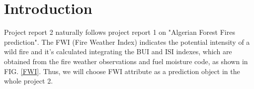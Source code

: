 \documentclass[10pt]{article}
\numberwithin{equation}{section}
\numberwithin{figure}{section}
\numberwithin{table}{section}
\begin{document}

\section{Introduction}
Project report 2 naturally follows project report 1 on "Algerian Forest Fires prediction". The FWI (Fire Weather Index) indicates the potential intensity of a wild fire and it's calculated integrating the BUI and ISI indexes, which are obtained from the fire weather observations and fuel moisture code, as shown in FIG. \ref{FWI}. Thus, we will choose FWI attribute as a prediction object in the whole project 2.
\end{document}
